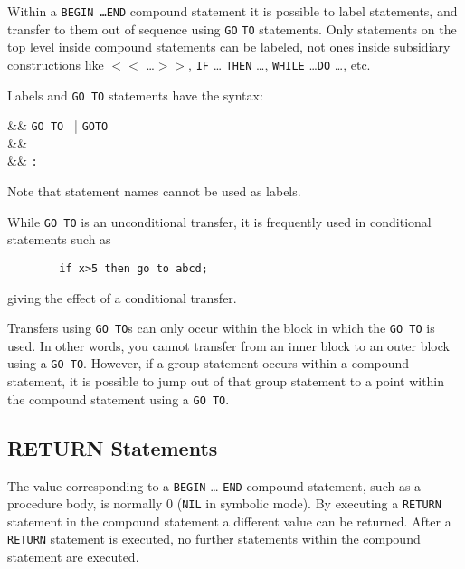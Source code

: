 Within a \texttt{BEGIN \ldots END} compound
statement it is possible to label statements, and transfer to them out of
sequence using \texttt{GO} \texttt{TO} statements.  Only statements on the top
level inside compound statements can be labeled, not ones inside
subsidiary constructions like \texttt{$<<$} \ldots \texttt{$>>$}, \texttt{IF} \ldots
\texttt{THEN} \ldots , \texttt{WHILE} \ldots \texttt{DO} \ldots , etc.

Labels and \texttt{GO TO} statements have the syntax:
\begin{syntaxtable}
   &\bnfprod& \texttt{GO TO }  | 
                                    \texttt{GOTO }  \\
   &\bnfprod& \\
   &\bnfprod& \texttt{:}
\end{syntaxtable}
Note that statement names cannot be used as labels.

While \texttt{GO TO} is an unconditional transfer, it is frequently used
in conditional statements such as
\begin{verbatim}
        if x>5 then go to abcd;
\end{verbatim}
giving the effect of a conditional transfer.

Transfers using \texttt{GO TO}s can only occur within the block in which the
\texttt{GO TO} is used.  In other words, you cannot transfer from an inner
block to an outer block using a \texttt{GO TO}.  However, if a group statement
occurs within a compound statement, it is possible to jump out of that group
statement to a point within the compound statement using a \texttt{GO TO}.

\subsection{RETURN Statements}
\hypertarget{command:RETURN}{}

The value corresponding to a \texttt{BEGIN} \ldots{} \texttt{END} compound
statement,
 such as a procedure body, is normally 0
(\texttt{NIL} in symbolic mode).  By executing a \texttt{RETURN}
statement in the compound statement a different value can be returned.
After a \texttt{RETURN} statement is executed, no further statements within
the compound statement are executed.

